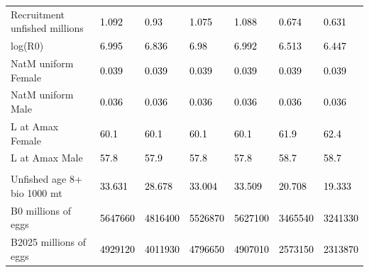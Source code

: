 \documentclass[
]{scrartcl}
\begin{document}
\begin{landscape}
\begin{longtable}[t]{ll>{\raggedright\arraybackslash}p{5em}>{\raggedright\arraybackslash}p{5em}>{\raggedright\arraybackslash}p{5em}>{\raggedright\arraybackslash}p{5em}>{\raggedright\arraybackslash}p{5em}}
\hspace{1em}Recruitment unfished millions & \textcolor{black}{1.092} & \textcolor{black}{0.93} & \textcolor{black}{1.075} & \textcolor{black}{1.088} & \textcolor{black}{0.674} & \textcolor{black}{0.631}\\
\hspace{1em}log(R0) & \textcolor{black}{6.995} & \textcolor{black}{6.836} & \textcolor{black}{6.98} & \textcolor{black}{6.992} & \textcolor{black}{6.513} & \textcolor{black}{6.447}\\
\hspace{1em}NatM uniform Female & \textcolor{black}{0.039} & \textcolor{black}{0.039} & \textcolor{black}{0.039} & \textcolor{black}{0.039} & \textcolor{black}{0.039} & \textcolor{black}{0.039}\\
\hspace{1em}NatM uniform Male & \textcolor{black}{0.036} & \textcolor{black}{0.036} & \textcolor{black}{0.036} & \textcolor{black}{0.036} & \textcolor{black}{0.036} & \textcolor{black}{0.036}\\
\hspace{1em}L at Amax Female & \textcolor{black}{60.1} & \textcolor{black}{60.1} & \textcolor{black}{60.1} & \textcolor{black}{60.1} & \textcolor{black}{61.9} & \textcolor{black}{62.4}\\
\hspace{1em}L at Amax Male & \textcolor{black}{57.8} & \textcolor{black}{57.9} & \textcolor{black}{57.8} & \textcolor{black}{57.8} & \textcolor{black}{58.7} & \textcolor{black}{58.7}\\
\addlinespace[0.3em]
\multicolumn{7}{l}{\textbf{Estimates of derived quantities}}\\
\hspace{1em}Unfished age 8+ bio 1000 mt & \textcolor{black}{33.631} & \textcolor{black}{28.678} & \textcolor{black}{33.004} & \textcolor{black}{33.509} & \textcolor{black}{20.708} & \textcolor{black}{19.333}\\
\hspace{1em}B0 millions of eggs & \textcolor{black}{5647660} & \textcolor{black}{4816400} & \textcolor{black}{5526870} & \textcolor{black}{5627100} & \textcolor{black}{3465540} & \textcolor{black}{3241330}\\
\hspace{1em}B2025 millions of eggs & \textcolor{black}{4929120} & \textcolor{black}{4011930} & \textcolor{black}{4796650} & \textcolor{black}{4907010} & \textcolor{black}{2573150} & \textcolor{black}{2313870}\\

\end{longtable}
\end{landscape}
\end{document}
